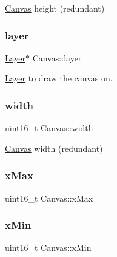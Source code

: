 \mbox{\hyperlink{struct_canvas}{Canvas}} height (redundant) 

\mbox{\label{group__canvas_gaf72f42e64c0a72256001acc241f287ce}} 
\subsubsection{\texorpdfstring{layer}{layer}}
{\footnotesize\ttfamily \mbox{\hyperlink{struct_layer}{Layer}}$\ast$ Canvas\+::layer}



\mbox{\hyperlink{struct_layer}{Layer}} to draw the canvas on. 

\mbox{\label{group__canvas_gaee9a970b56d8660b35047a170abc58ca}} 
\subsubsection{\texorpdfstring{width}{width}}
{\footnotesize\ttfamily uint16\+\_\+t Canvas\+::width}



\mbox{\hyperlink{struct_canvas}{Canvas}} width (redundant) 

\mbox{\label{group__canvas_ga423c26269827a5beb80f569ba8076ae2}} 
\subsubsection{\texorpdfstring{x\+Max}{xMax}}
{\footnotesize\ttfamily uint16\+\_\+t Canvas\+::x\+Max}

\mbox{\label{group__canvas_ga10925446227a312ac91f903acaf074e8}} 
\subsubsection{\texorpdfstring{x\+Min}{xMin}}
{\footnotesize\ttfamily uint16\+\_\+t Canvas\+::x\+Min}

\mbox{\label{group__canvas_ga2990194f0baef3d23cb75299cc39987d}} 
